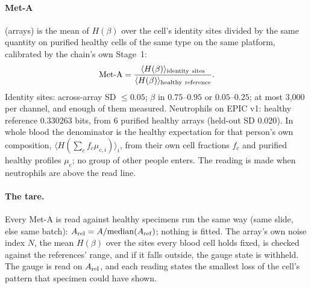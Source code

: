 \paragraph{Met-A} (arrays) is the mean of $H(\beta)$ over the cell's identity sites divided by the same quantity on purified healthy cells of the
same type on the same platform, calibrated by the chain's own Stage~1:
\begin{equation}\text{Met-A}=\frac{\langle H(\beta)\rangle_{\rm identity\ sites}}{\langle H(\beta)\rangle_{\rm healthy\ reference}}.\end{equation}
Identity sites: across-array SD $\le0.05$; $\beta$ in $0.75$--$0.95$ or $0.05$--$0.25$; at most 3,000 per channel, and enough of them
measured. Neutrophils on EPIC v1: healthy reference $0.330263$ bits, from 6 purified healthy arrays (held-out SD $0.020$). In whole blood the denominator is
the healthy expectation for that person's own composition, $\langle H(\sum_c f_c\mu_{c,i})\rangle_i$, from their own cell fractions $f_c$ and
purified healthy profiles $\mu_c$; no group of other people enters. The reading is made when neutrophils are above the read line.
\paragraph{The tare.} Every Met-A is read against healthy specimens run the same way (same slide, else same batch):
$A_{\rm rel}=A/\mathrm{median}(A_{\rm ref})$; nothing is fitted. The array's own noise index $N$, the mean $H(\beta)$ over the sites every
blood cell holds fixed, is checked against the references' range, and if it falls outside, the gauge state is withheld. The gauge is read on
$A_{\rm rel}$, and each reading states the smallest loss of the cell's pattern that specimen could have shown.

